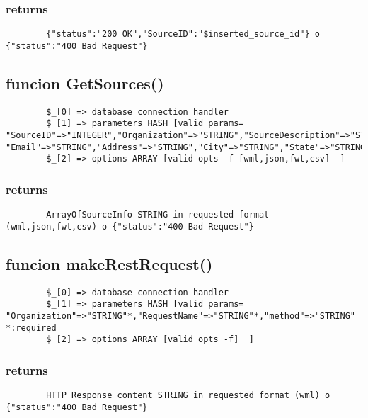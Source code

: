 \documentclass{article}
\begin{document}
\subsubsection*{returns\label{returns}}
\begin{verbatim}
        {"status":"200 OK","SourceID":"$inserted_source_id"} o {"status":"400 Bad Request"}
\end{verbatim}
\subsection*{funcion GetSources()\label{funcion_GetSources_}}
\begin{verbatim}
        $_[0] => database connection handler
        $_[1] => parameters HASH [valid params=  "SourceID"=>"INTEGER","Organization"=>"STRING","SourceDescription"=>"STRING","SourceLink"=>"STRING","ContactName"=>"STRING","Phone"=>"STRING", "Email"=>"STRING","Address"=>"STRING","City"=>"STRING","State"=>"STRING","ZipCode"=>"STRING","Citation"=>"STRING","MetadataID"=>"INTEGER"
        $_[2] => options ARRAY [valid opts -f [wml,json,fwt,csv]  ]
\end{verbatim}
\subsubsection*{returns\label{returns}}
\begin{verbatim}
        ArrayOfSourceInfo STRING in requested format (wml,json,fwt,csv) o {"status":"400 Bad Request"}
\end{verbatim}
\subsection*{funcion makeRestRequest()\label{funcion_makeRestRequest_}}
\begin{verbatim}
        $_[0] => database connection handler
        $_[1] => parameters HASH [valid params=  "Organization"=>"STRING"*,"RequestName"=>"STRING"*,"method"=>"STRING"       *:required
        $_[2] => options ARRAY [valid opts -f]  ]
\end{verbatim}
\subsubsection*{returns\label{returns}}
\begin{verbatim}
        HTTP Response content STRING in requested format (wml) o {"status":"400 Bad Request"}
\end{verbatim}
\end{document}
